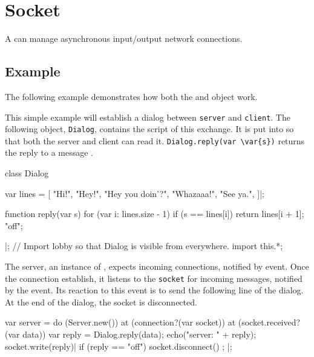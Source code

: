 
\section{Socket}

A  can manage asynchronous input/output network connections.

\subsection{Example}

The following example demonstrates how both the  and
 object work.

This simple example will establish a dialog between \lstinline|server| and
\lstinline|client|.  The following object, \lstinline|Dialog|, contains the
script of this exchange.  It is put into  so that both the
server and client can read it.  \lstinline|Dialog.reply(var \var{s})|
returns the reply to a message .

\begin{urbiscript}
class Dialog
{
  var lines =
  [
    "Hi!",
    "Hey!",
    "Hey you doin'?",
    "Whazaaa!",
    "See ya.",
  ]|;

  function reply(var s)
  {
    for (var i: lines.size - 1)
      if (s == lines[i])
        return lines[i + 1];
    "off";
  }
}|;
// Import lobby so that Dialog is visible from everywhere.
import this.*;
\end{urbiscript}

The server, an instance of , expects incoming connections,
notified by  event.  Once the connection
establish, it listens to the \lstinline|socket| for incoming messages,
notified by the  event.  Its reaction to this event is to
send the following line of the dialog.  At the end of the dialog, the socket
is disconnected.

\begin{urbiscript}
var server =
  do (Server.new())
  {
    at (connection?(var socket))
      at (socket.received?(var data))
      {
        var reply = Dialog.reply(data);
        echo("server: " + reply);
        socket.write(reply)|
        if (reply == "off")
          socket.disconnect()
      };
  }|;
\end{urbiscript}


